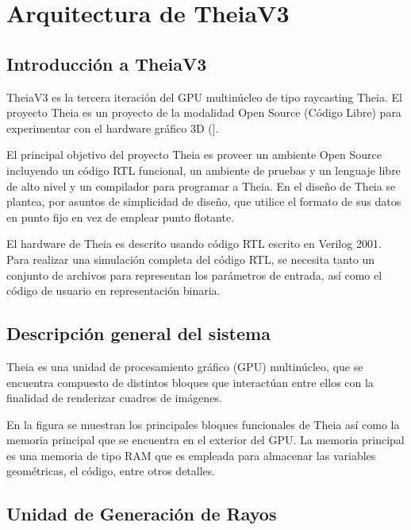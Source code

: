 
\section{Arquitectura de TheiaV3}
\subsection{Introducción a TheiaV3}
TheiaV3 es la tercera iteración del GPU multinúcleo de tipo raycasting Theia. El proyecto Theia es un proyecto de la modalidad Open Source (Código Libre) para experimentar con el hardware gráfico 3D (\cite{Valverde}].

El principal objetivo del proyecto Theia es proveer un ambiente Open Source incluyendo un código RTL funcional, un ambiente de pruebas y un lenguaje libre de alto nivel y un compilador para programar a Theia. En el diseño de Theia se plantea, por asuntos de simplicidad de diseño, que utilice el formato de sus datos en punto fijo en vez de emplear punto flotante.

El hardware de Theia es descrito usando código RTL escrito en Verilog 2001. Para realizar una simulación completa del código RTL, se necesita tanto un conjunto de archivos para representan los parámetros de entrada, así como el código de usuario en representación binaria.  

\subsection{Descripción general del sistema}

Theia es una unidad de procesamiento gráfico (GPU) multinúcleo, que se encuentra compuesto de distintos bloques que interactúan entre ellos con la finalidad de renderizar cuadros de imágenes.

En la figura se muestran los principales bloques funcionales de Theia así como la memoria principal que se encuentra en el exterior del GPU. La memoria principal es una memoria de tipo RAM que es empleada para almacenar las variables geométricas, el código, entre otros detalles.

\subsection{Unidad de Generación de Rayos}

